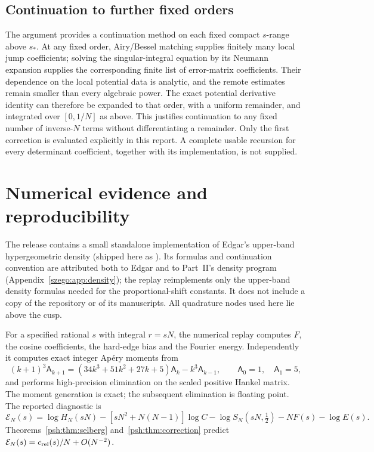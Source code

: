 \documentclass[11pt,a4paper]{article}
\numberwithin{equation}{section}
\theoremstyle{remark}\newtheorem{remark}[theorem]{Remark}
\newcommand{\A}{\mathsf A}
\begin{document}
\subsection{Continuation to further fixed orders}
The argument provides a continuation method on each fixed compact
$s$-range above $s_*$. At any fixed order, Airy/Bessel matching supplies
finitely many local jump coefficients; solving the singular-integral
equation by its Neumann expansion supplies the corresponding finite
list of error-matrix coefficients. Their dependence on the local
potential data is analytic, and the remote estimates remain smaller
than every algebraic power. The exact potential derivative identity can
therefore be expanded to that order, with a uniform remainder, and
integrated over $[0,1/N]$ as above. This justifies continuation to any
fixed number of inverse-$N$ terms without differentiating a remainder.
Only the first correction is evaluated explicitly in this report.
A complete usable recursion for every determinant coefficient, together
with its implementation, is not supplied.

\section{Numerical evidence and reproducibility}\label{psh:sec:numerics}
The release contains a small standalone implementation of Edgar's
upper-band hypergeometric density (shipped here as
). Its formulas and continuation
convention are attributed both to Edgar \cite{edgar} and to Part~II's
density program 
(Appendix~\ref{szego:app:density}); the replay reimplements only the
upper-band density formulas needed for the proportional-shift constants.
It does not include a copy of the repository or of its manuscripts. All
quadrature nodes used here lie above the cusp.

For a specified rational $s$ with integral $r=sN$, the numerical replay
computes $F$, the cosine coefficients, the hard-edge bias and the Fourier
energy. Independently it computes exact integer Ap\'ery moments from
\[
 (k+1)^3\A_{k+1}=(34k^3+51k^2+27k+5)\A_k-k^3\A_{k-1},
 \qquad \A_0=1,\quad\A_1=5,
\]
and performs high-precision elimination on the scaled positive Hankel
matrix. The moment generation is exact; the subsequent elimination is
floating point. The reported diagnostic is
\begin{equation}\label{psh:eq:error}
 \mathcal E_N(s)=\log H_N(sN)-[sN^2+N(N-1)]\log C
       -\log S_N(sN,\tfrac12)-NF(s)-\log E(s).
\end{equation}
Theorems~\ref{psh:thm:selberg} and~\ref{psh:thm:correction} predict
$\mathcal E_N(s)=c_{\rm rel}(s)/N+O(N^{-2})$.
\end{document}
